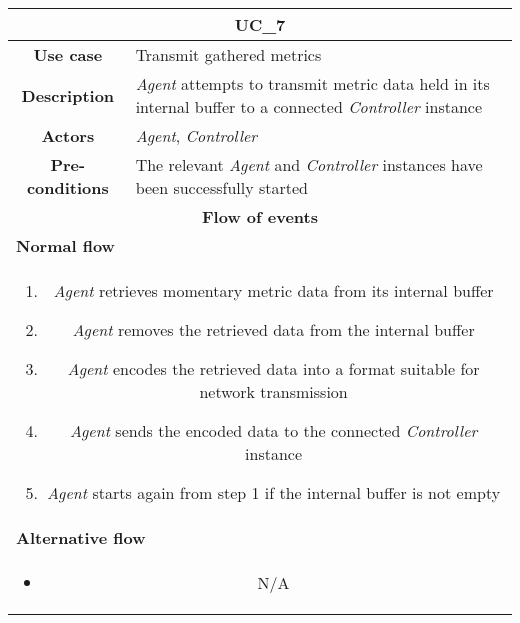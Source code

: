             \vspace{0.5cm}
            \noindent
            \begin{longtable}{ |c|p{11.8cm}| }
                \hline
                \multicolumn{2}{|c|}{\cellcolor{lime} \textbf{UC\_7}}\\ \hline
                \cellcolor[gray]{0.9} \textbf{Use case} & Transmit gathered metrics\\ \hline
                \cellcolor[gray]{0.9} \textbf{Description} & \textit{Agent} attempts to transmit metric data held in its internal buffer to a connected \textit{Controller} instance\\ \hline
                \cellcolor[gray]{0.9} \textbf{Actors} & \textit{Agent}, \textit{Controller}\\ \hline
                \cellcolor[gray]{0.9} \textbf{Pre-conditions} & The relevant \textit{Agent} and \textit{Controller} instances have been successfully started\\ \hline
                \multicolumn{2}{|c|}{\cellcolor[gray]{0.9} \textbf{Flow of events}}\\ \hline
                \multicolumn{2}{|l|}{\cellcolor[gray]{0.9} \textbf{Normal flow}}\\ \hline
                \multicolumn{2}{|p{14cm}|}{
                    \begin{enumerate}
                        \item \textit{Agent} retrieves momentary metric data from its internal buffer
                        \item \textit{Agent} removes the retrieved data from the internal buffer
                        \item \textit{Agent} encodes the retrieved data into a format suitable for network transmission
                        \item \textit{Agent} sends the encoded data to the connected \textit{Controller} instance
                        \item \textit{Agent} starts again from step 1 if the internal buffer is not empty
                    \end{enumerate}
                }\\ \hline
                \multicolumn{2}{|l|}{\cellcolor[gray]{0.9} \textbf{Alternative flow}}\\ \hline
                \multicolumn{2}{|p{14cm}|}{
                    \begin{itemize}
                        \item N/A

\end{itemize}}
\end{longtable}
